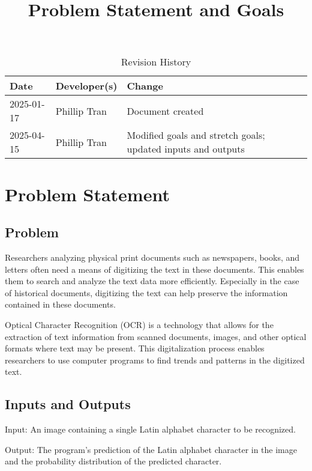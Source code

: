 \documentclass{article}
\title{Problem Statement and Goals\\\progname}
\author{\authname}
\date{}
\begin{document}
\maketitle

\begin{table}[hp]
\caption{Revision History} \label{TblRevisionHistory}
\begin{tabularx}{\textwidth}{llX}
\toprule
\textbf{Date} & \textbf{Developer(s)} & \textbf{Change}\\
\midrule
2025-01-17 & Phillip Tran & Document created \\
2025-04-15 & Phillip Tran & Modified goals and stretch goals; updated inputs and outputs \\
\bottomrule
\end{tabularx}
\end{table}

\section{Problem Statement}

\subsection{Problem}

Researchers analyzing physical print documents such as newspapers, books, and
letters often need a means of digitizing the text in these documents. This
enables them to search and analyze the text data more efficiently. Especially
in the case of historical documents, digitizing the text can help preserve the
information contained in these documents.

Optical Character Recognition (OCR) is a technology that allows for the
extraction of text information from scanned documents, images, and other optical
formats where text may be present. This digitalization process enables
researchers to use computer programs to find trends and patterns in the
digitized text.


\subsection{Inputs and Outputs}

Input: An image containing a single Latin alphabet character to be recognized.

Output: The program's prediction of the Latin alphabet character in the image
and the probability distribution of the predicted character.
\end{document}
